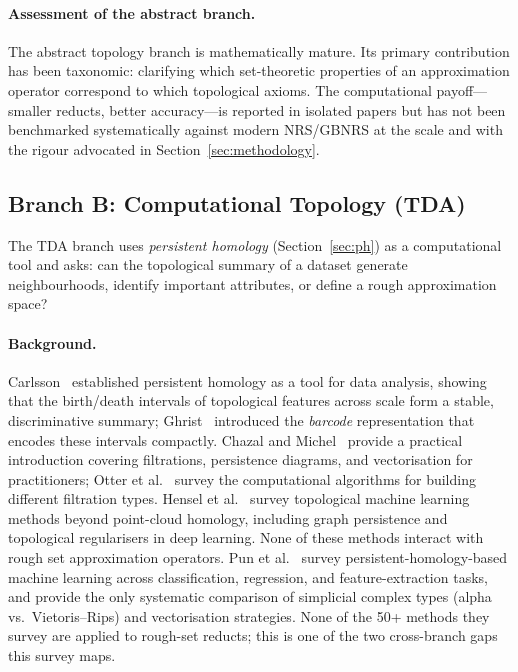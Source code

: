 \paragraph{Assessment of the abstract branch.}
The abstract topology branch is mathematically mature.  Its primary
contribution has been taxonomic: clarifying which set-theoretic properties
of an approximation operator correspond to which topological axioms.  The
computational payoff---smaller reducts, better accuracy---is reported in
isolated papers but has not been benchmarked systematically against modern
NRS/GBNRS at the scale and with the rigour advocated in
Section~\ref{sec:methodology}.

\subsection{Branch B: Computational Topology (TDA)}
\label{sec:tda}

The TDA branch uses \emph{persistent homology} (Section~\ref{sec:ph}) as
a computational tool and asks: can the topological summary of a dataset
generate neighbourhoods, identify important attributes, or define a rough
approximation space?

\paragraph{Background.}
Carlsson~\cite{Carlsson2009topology} established persistent homology as a
tool for data analysis, showing that the birth/death intervals of topological
features across scale form a stable, discriminative summary;
Ghrist~\cite{Ghrist2008barcodes} introduced the \emph{barcode} representation
that encodes these intervals compactly.
Chazal and Michel~\cite{ChazalMichel2021TDA} provide a practical introduction
covering filtrations, persistence diagrams, and vectorisation for practitioners;
Otter et al.~\cite{Otter2017roadmap} survey the computational algorithms
for building different filtration types.
Hensel et al.~\cite{HenselMoorRieck2021} survey topological machine learning
methods beyond point-cloud homology, including graph persistence and topological
regularisers in deep learning.  None of these methods interact with rough set
approximation operators.
Pun et al.~\cite{Pun2022PH} survey persistent-homology-based machine learning
across classification, regression, and feature-extraction tasks, and provide
the only systematic comparison of simplicial complex types (alpha vs.\
Vietoris--Rips) and vectorisation strategies.  None of the 50+ methods they
survey are applied to rough-set reducts; this is one of the two cross-branch
gaps this survey maps.

